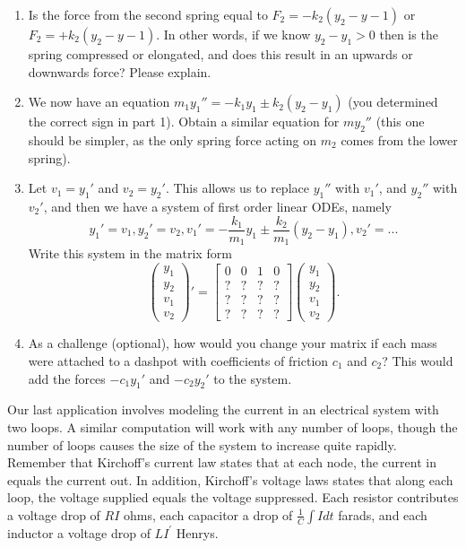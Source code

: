 \begin{problem}
\begin{enumerate}
\item Is the force from the second spring equal to $F_2=-k_2(y_2-y-1)$ or $F_2=+k_2(y_2-y-1)$.  In other words, if we know $y_2-y_1>0$ then is the spring compressed or elongated,  and does this result in an upwards or downwards force?  Please explain.
\item We now have an equation $m_1y_1'' = -k_1 y_1 \pm k_2(y_2-y_1)$ (you determined the correct sign in part 1). Obtain a similar equation for $my_2''$ (this one should be simpler, as the only spring force acting on $m_2$ comes from the lower spring).
 \item Let $v_1=y_1'$ and $v_2=y_2'$. This allows us to replace $y_1''$ with $v_1'$, and $y_2''$ with $v_2'$, and then we have a system of first order linear ODEs, namely $$y_1'=v_1, y_2'=v_2, v_1'=-\frac{k_1}{m_1} y_1 \pm \frac{k_2}{m_1}(y_2-y_1), v_2'=...$$  Write this system in the matrix form 
$$
\begin{pmatrix}
 y_1\\y_2\\v_1\\v_2
\end{pmatrix}'
=
\begin{bmatrix}
 0&0&1&0\\
 ?&?&?&?\\
 ?&?&?&?\\
 ?&?&?&?
\end{bmatrix}
\begin{pmatrix}
 y_1\\y_2\\v_1\\v_2
\end{pmatrix}.
$$
\item As a challenge (optional), how would you change your matrix if each mass were attached to a dashpot with coefficients of friction $c_1$ and $c_2$?  This would add the forces $-c_1 y_1'$ and $-c_2y_2'$ to the system.
\end{enumerate}
\end{problem}












Our last application involves modeling the current in an electrical system with two loops. A similar computation will work with any number of loops, though the number of loops causes the size of the system to increase quite rapidly.
Remember that Kirchoff's current law states that at each node, the current in equals the current out.  In addition, Kirchoff's voltage laws states that along each loop, the voltage supplied equals the voltage suppressed. Each resistor contributes a voltage drop of $RI$ ohms, each capacitor a drop of $\frac{1}{C}\int I dt$ farads, and each inductor a voltage drop of $LI^\prime$ Henrys.

